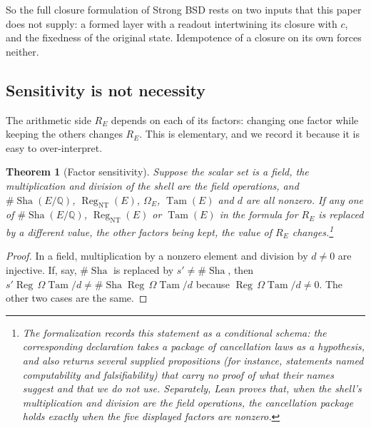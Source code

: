 \documentclass[11pt]{article}
\newtheorem{theorem}{Theorem}[section]
\theoremstyle{definition}
\newcommand{\Q}{\mathbb{Q}}
\newcommand{\Sha}{\operatorname{Sha}}
\newcommand{\Reg}{\operatorname{Reg}}
\newcommand{\Tam}{\operatorname{Tam}}
\begin{document}
So the full closure formulation of Strong BSD rests on two inputs that
this paper does not supply: a formed layer with a readout intertwining its
closure with $c$, and the fixedness of the original state.  Idempotence
of a closure on its own forces neither.

\subsection{Sensitivity is not necessity}
\label{sec:sensitivity}

The arithmetic side $R_E$ depends on each of its factors: changing one
factor while keeping the others changes $R_E$.  This is elementary, and
we record it because it is easy to over-interpret.

\begin{theorem}[Factor sensitivity]\label{thm:closure:composite-signature}
Suppose the scalar set is a field, the multiplication and division of
the shell are the field operations, and $\#\Sha(E/\Q)$,
$\Reg_{\mathrm{NT}}(E)$, $\Omega_E$, $\Tam(E)$ and $d$ are all nonzero.
If any one of $\#\Sha(E/\Q)$, $\Reg_{\mathrm{NT}}(E)$ or $\Tam(E)$ in the
formula for $R_E$ is replaced by a different value, the other factors
being kept, the value of $R_E$ changes.\footnote{The formalization records this statement as a conditional
schema: the corresponding declaration takes a package of cancellation
laws as a hypothesis, and also returns several supplied propositions (for
instance, statements named computability and falsifiability) that carry
no proof of what their names suggest and that we do not use.  Separately,
Lean proves that, when the shell's multiplication and division are the
field operations, the cancellation package holds exactly when the five
displayed factors are nonzero.}
\end{theorem}

\begin{proof}
In a field, multiplication by a nonzero element and division by $d\neq0$
are injective.  If, say, $\#\Sha$ is replaced by $s'\neq\#\Sha$, then
$s'\Reg\,\Omega\Tam/d\neq\#\Sha\Reg\,\Omega\Tam/d$ because
$\Reg\,\Omega\Tam/d\neq0$.  The other two cases are the same.
\end{proof}
\end{document}
